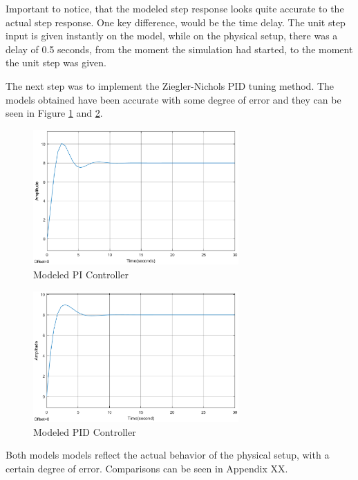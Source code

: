 {Important to notice, that the modeled step response looks quite accurate to the actual step response.
One key difference, would be the time delay. The unit step input is given instantly on the model,
while on the physical setup, there was a delay of 0.5 seconds, from the moment the simulation had started,
to the moment the unit step was given.

The next step was to implement the Ziegler-Nichols PID tuning method. The models obtained have been accurate
with some degree of error and they can be seen in Figure \ref{fig:modeledPI} and \ref{fig:modeledPID}.


\begin{figure}[ht]
	\centering
	\includegraphics[width=0.7\textwidth]{figures/06ModelValidation/modelPI.eps}
	\caption{Modeled PI Controller}
	\label{fig:modeledPI}
\end{figure}

\begin{figure}[ht]
	\centering
	\includegraphics[width=0.7\textwidth]{figures/06ModelValidation/modelPID.eps}
	\caption{Modeled PID Controller}
	\label{fig:modeledPID}
\end{figure}

Both models models reflect the actual behavior of the physical setup, with a certain degree of error.
Comparisons can be seen in Appendix XX. 

}
